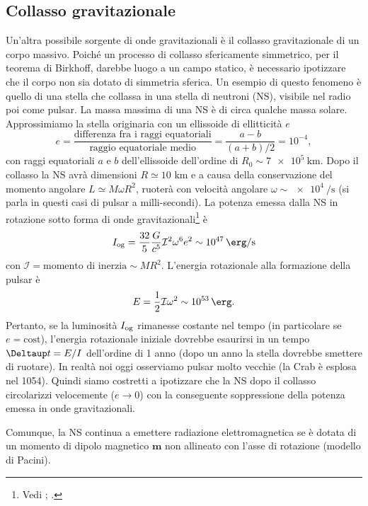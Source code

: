 \subsection{Collasso gravitazionale}
\label{sec:collasso-grav}

Un'altra possibile sorgente di onde gravitazionali è il collasso gravitazionale
di un corpo massivo.  Poiché un processo di collasso sfericamente simmetrico,
per il teorema di Birkhoff, darebbe luogo a un campo statico, è necessario
ipotizzare che il corpo non sia dotato di simmetria sferica.  Un esempio di
questo fenomeno è quello di una stella che collassa in una stella di neutroni
(NS), visibile nel radio poi come pulsar.  La massa massima di una NS è di circa
qualche massa solare.  Approssimiamo la stella originaria con un ellissoide di
ellitticità $e$
\begin{equation}
  e = \frac{\text{differenza fra i raggi equatoriali}}{\text{raggio equatoriale
      medio}}  = \frac{a-b}{(a+b)/2} = 10^{-4},
\end{equation}
con raggi equatoriali $a$ e $b$ dell'ellissoide dell'ordine di $R_{0} \sim
\SI{7e5}{\kilo\metre}$.  Dopo il collasso la NS avrà dimensioni $R \simeq 10$ km
e a causa della conservazione del momento angolare $L \simeq M \omega R^2$,
ruoterà con velocità angolare $\omega \sim
\SI[per-mode=reciprocal]{e4}{\per\second}$ (si parla in questi casi di pulsar a
milli-secondi).  La potenza emessa dalla NS in rotazione sotto forma di onde
gravitazionali\footnote{Vedi \textcite[488]{shapiro:black-holes};
  \textcite[272]{weinberg:gravitation}.} è
\begin{equation}
  I_{\textup{og}} = \frac{32}{5} \frac{G}{c^{5}} \mathcal{I}^{2} \omega^{6}
  e^{2} \sim \SI{e47}{\erg\per\second}
\end{equation}
con $\mathcal{I} = \text{momento di inerzia} \sim MR^{2}$.  L'energia
rotazionale alla formazione della pulsar è
\begin{equation}
  E = \frac{1}{2} \mathcal{I} \omega^{2} \sim \SI{e53}{\erg}.
\end{equation}
Pertanto, se la luminosità $I_{\textup{og}}$ rimanesse costante nel tempo (in
particolare se $e=\text{cost}$), l'energia rotazionale iniziale dovrebbe
esaurirsi in un tempo $\var t = E/I$ dell'ordine di 1 anno (dopo un anno la
stella dovrebbe smettere di ruotare).  In realtà noi oggi osserviamo pulsar
molto vecchie (la Crab è esplosa nel 1054).  Quindi siamo costretti a ipotizzare
che la NS dopo il collasso circolarizzi velocemente ($e \to 0$) con la
conseguente soppressione della potenza emessa in onde gravitazionali.

Comunque, la NS continua a emettere radiazione elettromagnetica se è dotata di
un momento di dipolo magnetico $\bm{m}$ non allineato con l'asse di rotazione
(modello di Pacini).

